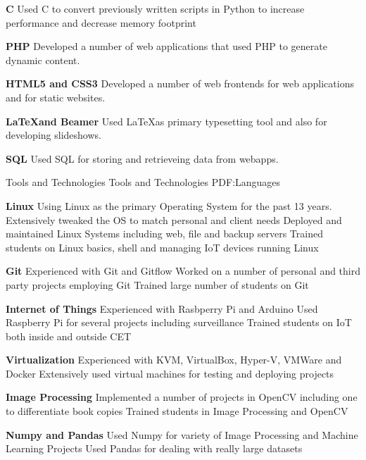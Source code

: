 \documentclass[letterpaper,MMMyyyy,nonstopmode]{simpleresumecv}
\begin{document}
\begin{Body}
\BigGap
\BulletItem
\textbf{C}
\SubBulletItem
Used C to convert previously written scripts in Python to increase performance
and decrease memory footprint

\BigGap
\BulletItem
\textbf{PHP}
\SubBulletItem
Developed a number of web applications that used PHP to generate dynamic
content.

\BigGap
\BulletItem
\textbf{HTML5 and CSS3}
\SubBulletItem
Developed a number of web frontends for web applications and for static
websites.

\BigGap
\BulletItem
\textbf{\LaTeX and Beamer}
\SubBulletItem
Used \LaTeX as primary typesetting tool and also for developing slideshows.

\BigGap
\BigGap
\BulletItem
\textbf{SQL}
\SubBulletItem
Used SQL for storing and retrieveing data from webapps.


\BigGap
\Section
{Tools and Technologies}
{Tools and Technologies}
{PDF:Languages}

\BulletItem
\textbf{Linux}
\SubBulletItem
Using Linux as the primary Operating System for the past 13 years.
\SubBulletItem
Extensively tweaked the OS to match personal and client needs
\SubBulletItem
Deployed and maintained Linux Systems including web, file and backup servers
\SubBulletItem
Trained students on Linux basics, shell and managing IoT devices running Linux

\BigGap
\BulletItem
\textbf{Git}
\SubBulletItem
Experienced with Git and Gitflow
\SubBulletItem
Worked on a number of personal and third party projects employing Git
\SubBulletItem
Trained large number of students on Git

\BigGap
\BulletItem
\textbf{Internet of Things}
\SubBulletItem
Experienced with Rasbperry Pi and Arduino 
\SubBulletItem
Used Raspberry Pi for several projects including surveillance
\SubBulletItem
Trained students on IoT both inside and outside CET

\BigGap
\BulletItem
\textbf{Virtualization}
\SubBulletItem
Experienced with KVM, VirtualBox, Hyper-V, VMWare and Docker
\SubBulletItem
Extensively used virtual machines for testing and deploying projects

\BigGap
\BulletItem
\textbf{Image Processing}
\SubBulletItem
Implemented a number of projects in OpenCV including one to differentiate book
copies
\SubBulletItem
Trained students in Image Processing and OpenCV

\BigGap
\BulletItem
\textbf{Numpy and Pandas}
\SubBulletItem
Used Numpy for variety of Image Processing and Machine Learning Projects
\SubBulletItem
Used Pandas for dealing with really large datasets


\end{Body}
\end{document}
